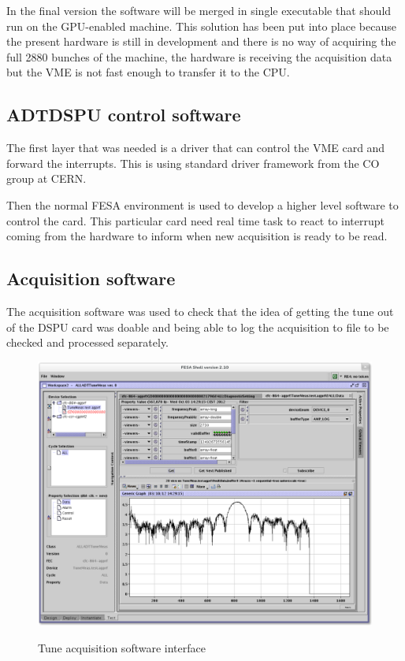 In the final version the software will be merged in single executable that should run on the \gls{GPU}-enabled machine. This solution has been put into place because the present hardware is still in development and there is no way of acquiring the full 2880 bunches of the machine, the hardware is receiving the acquisition data but the \gls{VME} is not fast enough to transfer it to the \gls{CPU}.

	\subsection{ADTDSPU control software}

	The first layer that was needed is a driver that can control the \gls{VME} card and forward the interrupts. This is using standard driver framework from the \gls{CO} group at \gls{CERN}.

	Then the normal \gls{FESA} environment is used to develop a higher level software to control the card. This particular card need real time task to react to interrupt coming from the hardware to inform when new acquisition is ready to be read.

	\subsection{Acquisition software}

	The acquisition software was used to check that the idea of getting the tune out of the DSPU card was doable and being able to log the acquisition to file to be checked and processed separately.

	\begin{figure}[H]
	\caption{Tune acquisition software interface}
	\centering
	\includegraphics[scale=0.3]{amplitude_log.pdf}
	\label{fig:tuneacq}
	\end{figure}

